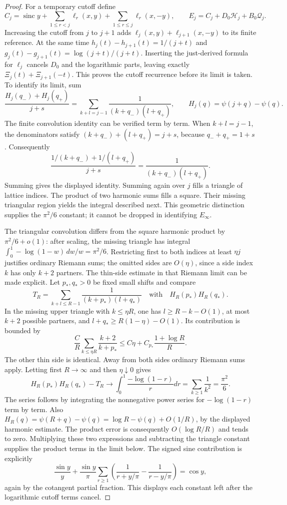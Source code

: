 \begin{proof}
For a temporary cutoff define
\[
 C_j=\operatorname{sinc}y+\sum_{1\leq r<j}\ell_r(x,y)
          +\sum_{1\leq r\leq j}\ell_r(x,-y),\qquad
 E_j=C_j+D_0\mathcal H_j+B_0\mathcal Q_j.
\]
Increasing the cutoff from $j$ to $j+1$ adds
$\ell_j(x,y)+\ell_{j+1}(x,-y)$ to its finite reference. At the same
time $h_j(t)-h_{j+1}(t)=1/(j+t)$ and
$g_j(t)-g_{j+1}(t)=\log(j+t)/(j+t)$. Inserting the just-derived
formula for $\ell_j$ cancels $D_0$ and the logarithmic parts, leaving
exactly $\Xi_j(t)+\Xi_{j+1}(-t)$. This proves the cutoff recurrence
before its limit is taken.
To identify its limit, sum
\[
 \frac{H_j(q_-)+H_j(q_+)}{j+s}
 =\sum_{k+l=j-1}\frac1{(k+q_-)(l+q_+)},\qquad
 H_j(q)=\psi(j+q)-\psi(q).
\]
The finite convolution identity can be verified term by term. When
$k+l=j-1$, the denominators satisfy
$(k+q_-)+(l+q_+)=j+s$, because $q_-+q_+=1+s$.
Consequently
\[
 \frac{1/(k+q_-)+1/(l+q_+)}{j+s}
 =\frac1{(k+q_-)(l+q_+)}.
\]
Summing gives the displayed identity. Summing again over $j$ fills a
triangle of lattice indices. The product of two harmonic sums fills a
square. Their missing triangular region yields the integral described
next. This geometric distinction supplies the $\pi^2/6$ constant;
it cannot be dropped in identifying $E_\infty$.

The triangular convolution differs from the square harmonic product by
$\pi^2/6+o(1)$: after scaling, the missing triangle has integral
$\int_0^1-\log(1-w)\,dw/w=\pi^2/6$. Restricting first to both
indices at least $\eta j$ justifies ordinary Riemann sums; the omitted
sides are $O(\eta)$, since a side index $k$ has only $k+2$ partners.
The thin-side estimate in that Riemann limit can be made explicit.
Let $p_*,q_*>0$ be fixed small shifts and compare
\[
 T_R=\sum_{k+l\leq R-1}\frac1{(k+p_*)(l+q_*)}
 \quad\text{with}\quad
 H_R(p_*)H_R(q_*).
\]
In the missing upper triangle with $k\leq\eta R$, one has
$l\geq R-k-O(1)$, at most $k+2$ possible partners, and
$l+q_*\geq R(1-\eta)-O(1)$. Its contribution is bounded by
\[
 \frac{C}{R}\sum_{k\leq\eta R}\frac{k+2}{k+p_*}
 \leq C\eta+C_{p_*}\frac{1+\log R}{R}.
\]
The other thin side is identical. Away from both sides ordinary
Riemann sums apply. Letting first $R\to\infty$ and then
$\eta\downarrow0$ gives
\[
 H_R(p_*)H_R(q_*)-T_R\longrightarrow
 \int_0^1\frac{-\log(1-r)}rdr=\sum_{k\geq1}\frac1{k^2}=\frac{\pi^2}{6}.
\]
The series follows by integrating the nonnegative power series for
$-\log(1-r)$ term by term. Also
$H_R(q)=\psi(R+q)-\psi(q)=\log R-\psi(q)+O(1/R)$,
by the displayed harmonic estimate. The product error is consequently
$O(\log R/R)$ and tends to zero. Multiplying these two expressions and subtracting the
triangle constant supplies the product terms in the limit below.
The signed sine contribution is explicitly
\[
 \frac{\sin y}{y}+\frac{\sin y}{\pi}
       \sum_{r\geq1}\left(\frac1{r+y/\pi}-\frac1{r-y/\pi}\right)
 =\cos y,
\]
again by the cotangent partial fraction. This displays each constant
left after the logarithmic cutoff terms cancel.


\end{proof}
